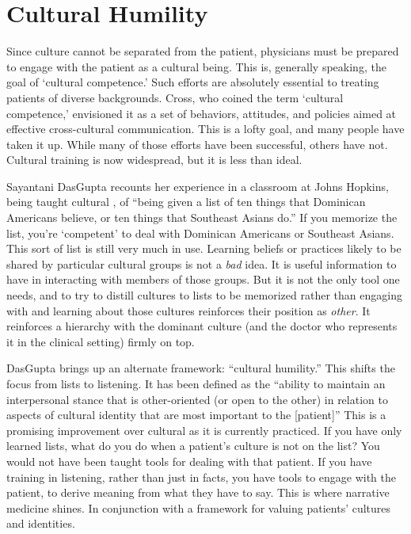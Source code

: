 \documentclass[12pt]{article}
\begin{document}
\section{Cultural Humility}

Since culture cannot be separated from the patient, physicians must be prepared
to engage with the patient as a cultural being. This is, generally speaking,
the goal of `cultural competence.' Such efforts are absolutely
essential to treating patients of diverse backgrounds.
Cross, who coined the term `cultural competence,' envisioned it as a set of
behaviors, attitudes, and policies aimed at effective cross-cultural
communication.\autocite{Cross89} This is a lofty goal, and many people have
taken it up. While many of those efforts have been successful, others have not.
Cultural  training is now widespread, but it is less than ideal.

Sayantani DasGupta recounts her experience in a classroom at Johns Hopkins, 
being taught cultural , of ``being given a list of ten things that
Dominican Americans believe, or ten things that Southeast Asians
do.''\autocite{DasGupta13} If you memorize the list, you're `competent' to deal
with Dominican Americans or Southeast Asians. This sort of list is still very
much in use.\autocite{HealthCareChaplaincy13} Learning beliefs or practices
likely to be shared by particular cultural groups is not a \emph{bad} idea. It
is useful information to have in interacting with members of those groups. But
it is not the only tool one needs, and to try to distill cultures to lists to
be memorized rather than engaging with and learning about those cultures
reinforces their position as \emph{other}. It reinforces a hierarchy with the
dominant culture (and the doctor who represents it in the clinical setting)
firmly on top.

DasGupta brings up an alternate framework: ``cultural humility.'' This shifts
the focus from lists to listening.  It has been defined as the ``ability to
maintain an interpersonal stance that is other-oriented (or open to the other)
in relation to aspects of cultural identity that are most important to the
[patient]''\autocite{Hook13} This is a promising improvement over cultural
 as it is currently practiced. If you have only learned lists, what
do you do when a patient's culture is not on the list? You would not have been
taught tools for dealing with that patient. If you have training in listening,
rather than just in facts, you have tools to engage with the patient, to derive
meaning from what they have to say. This is where narrative medicine shines. In
conjunction with a framework for valuing patients' cultures and identities.
\end{document}
